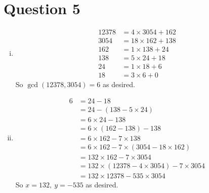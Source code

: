 \documentclass[11pt]{article}
\begin{document}
\section*{Question 5}
\begin{enumerate}[(i)]
    \item 
    \begin{align*}
        12378&=4\times 3054 +162\\
        3054&= 18 \times 162 +138\\
        162 & = 1\times 138 +24\\
        138&=5\times 24 +18\\
        24 &=1\times 18+6\\
        18&=3\times 6 + 0
    \end{align*}
    So $\gcd{(12378,3054)}=6$ as desired.
    \item
    \begin{align*}
        6&=24-18\\
        &=24-(138-5\times 24)\\
        &=6\times 24-138\\
        &=6\times(162-138)-138\\
        &=6\times 162-7\times 138\\
        &=6\times 162 -7\times(3054-18\times 162)\\
        &=132\times 162 - 7\times 3054\\
        &=132\times (12378-4\times 3054)-7\times3054\\
        &=132\times 12378  - 535\times 3054
    \end{align*}
    So $x=132,\ y=-535$ as desired.
\end{enumerate}
\end{document}
